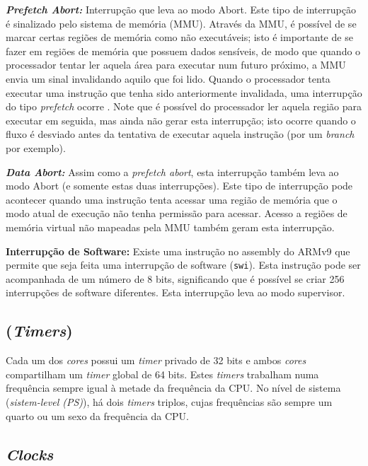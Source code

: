 \textbf{\emph{Prefetch Abort: }} Interrupção que leva ao modo Abort. Este tipo de interrupção é sinalizado pelo sistema de memória (MMU). Através da MMU, é possível de se marcar certas regiões de memória como não executáveis; isto é importante de se fazer em regiões de memória que possuem dados sensíveis, de modo que quando o processador tentar ler aquela área para executar num futuro próximo, a MMU envia um sinal invalidando aquilo que foi lido. Quando o processador tenta executar uma instrução que tenha sido anteriormente invalidada, uma interrupção do tipo \emph{prefetch} ocorre \cite[p.~58]{armarm}. Note que é possível do processador ler aquela região para executar em seguida, mas ainda não gerar esta interrupção; isto ocorre quando o fluxo é desviado antes da tentativa de executar aquela instrução (por um \emph{branch} por exemplo).

\textbf{\emph{Data Abort:}} Assim como a \emph{prefetch abort}, esta interrupção também leva ao modo Abort (e somente estas duas interrupções). Este tipo de interrupção pode acontecer quando uma instrução tenta acessar uma região de memória que o modo atual de execução não tenha permissão para acessar. Acesso a regiões de memória virtual não mapeadas pela MMU também geram esta interrupção.


\textbf{Interrupção de Software: } Existe uma instrução no assembly do ARMv9 que permite que seja feita uma interrupção de software (\verb+swi+). Esta instrução pode ser acompanhada de um número de 8 bits, significando que é possível se criar 256 interrupções de software diferentes. Esta interrupção leva ao modo supervisor.

\subsection{(\emph{Timers})}
Cada um dos \emph{cores} possui um \emph{timer} privado de 32 bits e ambos \emph{cores} compartilham um \emph{timer} global de 64 bits. Estes \emph{timers} trabalham numa frequência sempre igual à metade da frequência da CPU.
No nível de sistema (\emph{sistem-level (PS)}), há dois \emph{timers} triplos, cujas frequências são sempre um quarto ou um sexo da frequência da CPU.




\subsection{\emph{Clocks}}

